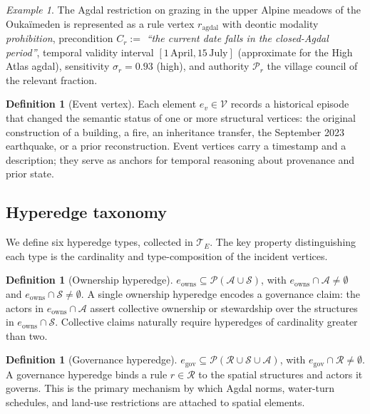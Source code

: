 \documentclass[11pt,a4paper]{article}
\theoremstyle{plain}
\theoremstyle{definition}
\newtheorem{definition}[theorem]{Definition}
\theoremstyle{remark}
\newtheorem{example}[theorem]{Example}
\newcommand{\Struc}{\mathcal{S}}
\newcommand{\Act}{\mathcal{A}}
\newcommand{\Rul}{\mathcal{R}}
\newcommand{\Evt}{\mathcal{V}}
\newcommand{\Te}{\mathcal{T}_E}
\begin{document}
\begin{example}
The Agdal restriction on grazing in the upper Alpine meadows of the
Oukaïmeden is represented as a rule vertex $r_{\mathrm{agdal}}$ with
deontic modality \textit{prohibition}, precondition $C_r :=$
\emph{``the current date falls in the closed-Agdal period''},
temporal validity interval $[1\,\text{April}, 15\,\text{July}]$
(approximate for the High Atlas agdal), sensitivity $\sigma_r = 0.93$
(high), and authority $\mathcal{P}_r$ the village council of the
relevant fraction.
\end{example}

\begin{definition}[Event vertex]
Each element $e_v \in \Evt$ records a historical episode that changed
the semantic status of one or more structural vertices: the original
construction of a building, a fire, an inheritance transfer, the
September 2023 earthquake, or a prior reconstruction. Event vertices
carry a timestamp and a description; they serve as anchors for
temporal reasoning about provenance and prior state.
\end{definition}

\subsection{Hyperedge taxonomy}
\label{sec:layer2_edges}

We define six hyperedge types, collected in $\Te$. The key property
distinguishing each type is the cardinality and type-composition of the
incident vertices.

\begin{definition}[Ownership hyperedge]
$e_{\mathrm{owns}} \subseteq \mathcal{P}(\Act \cup \Struc)$,
with $e_{\mathrm{owns}} \cap \Act \neq \emptyset$ and
$e_{\mathrm{owns}} \cap \Struc \neq \emptyset$.
A single ownership hyperedge encodes a governance claim: the actors in
$e_{\mathrm{owns}} \cap \Act$ assert collective ownership or stewardship
over the structures in $e_{\mathrm{owns}} \cap \Struc$. Collective
claims naturally require hyperedges of cardinality greater than two.
\end{definition}

\begin{definition}[Governance hyperedge]
$e_{\mathrm{gov}} \subseteq \mathcal{P}(\Rul \cup \Struc \cup \Act)$,
with $e_{\mathrm{gov}} \cap \Rul \neq \emptyset$.
A governance hyperedge binds a rule $r \in \Rul$ to the spatial
structures and actors it governs. This is the primary mechanism by
which Agdal norms, water-turn schedules, and land-use restrictions are
attached to spatial elements.
\end{definition}
\end{document}
